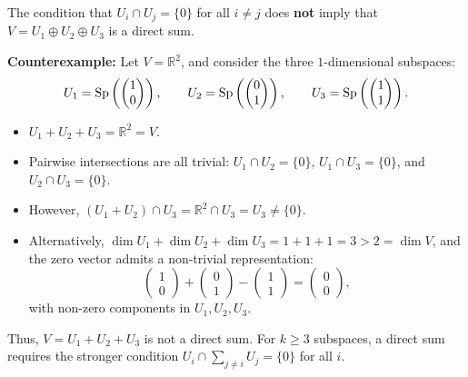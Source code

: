 \begin{exercisesolution}
\label{sol:pairwise_trivial_vs_direct_sum}
The condition that $U_i \cap U_j = \{0\}$ for all $i \ne j$ does \textbf{not} imply that $V = U_1 \oplus U_2 \oplus U_3$ is a direct sum.

\textbf{Counterexample:}
Let $V = \mathbb{R}^2$, and consider the three $1$-dimensional subspaces:
\[
U_1 = \operatorname{Sp}\left(\begin{pmatrix} 1 \\ 0 \end{pmatrix}\right), \qquad
U_2 = \operatorname{Sp}\left(\begin{pmatrix} 0 \\ 1 \end{pmatrix}\right), \qquad
U_3 = \operatorname{Sp}\left(\begin{pmatrix} 1 \\ 1 \end{pmatrix}\right).
\]
\begin{itemize}
    \item $U_1 + U_2 + U_3 = \mathbb{R}^2 = V$.
    \item Pairwise intersections are all trivial: $U_1 \cap U_2 = \{0\}$, $U_1 \cap U_3 = \{0\}$, and $U_2 \cap U_3 = \{0\}$.
    \item However, $(U_1 + U_2) \cap U_3 = \mathbb{R}^2 \cap U_3 = U_3 \ne \{0\}$.
    \item Alternatively, $\dim U_1 + \dim U_2 + \dim U_3 = 1 + 1 + 1 = 3 > 2 = \dim V$, and the zero vector admits a non-trivial representation:
    \[
    \begin{pmatrix} 1 \\ 0 \end{pmatrix} + \begin{pmatrix} 0 \\ 1 \end{pmatrix} - \begin{pmatrix} 1 \\ 1 \end{pmatrix} = \begin{pmatrix} 0 \\ 0 \end{pmatrix},
    \]
    with non-zero components in $U_1, U_2, U_3$.
\end{itemize}
Thus, $V = U_1 + U_2 + U_3$ is not a direct sum. For $k \ge 3$ subspaces, a direct sum requires the stronger condition $U_i \cap \sum_{j \ne i} U_j = \{0\}$ for all $i$.
\end{exercisesolution}

